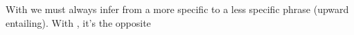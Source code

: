 \documentclass[headrule,footrule]{foils}
\begin{document}
With  we must always infer from a more specific to a less
specific phrase (upward entailing). With , it's the opposite

\end{document}
